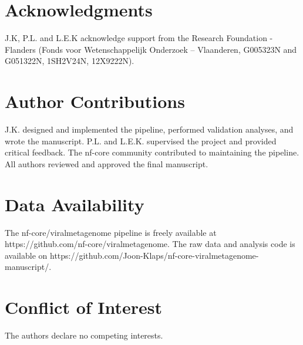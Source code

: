 \section*{Acknowledgments}
 J.K, P.L. and L.E.K  acknowledge support from the Research Foundation - Flanders (Fonds voor Wetenschappelijk Onderzoek – Vlaanderen, G005323N and G051322N, 1SH2V24N, 12X9222N).

\section*{Author Contributions}
J.K. designed and implemented the pipeline, performed validation analyses, and wrote the manuscript. P.L. and L.E.K. supervised the project and provided critical feedback. The nf-core community contributed to maintaining the pipeline. All authors reviewed and approved the final manuscript.

\section*{Data Availability}
The nf-core/viralmetagenome pipeline is freely available at https://github.com/nf-core/viralmetagenome.
The raw data and analysis code is available on https://github.com/Joon-Klaps/nf-core-viralmetagenome-manuscript/.

\section*{Conflict of Interest}
The authors declare no competing interests.

